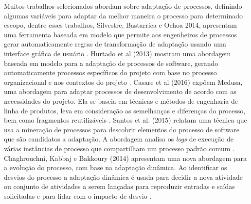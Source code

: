 Muitos trabalhos selecionados abordam sobre adaptação de processos, definindo algumas variáveis para adaptar da melhor maneira o processo para determinado escopo, dentre esses trabalhos, Silvestre, Bastarrica e Ochoa 2014, apresentam uma ferramenta baseada em modelo que permite aos engenheiros de processos gerar automaticamente regras de transformação de adaptação usando uma interface gráfica de usuário \cite{3silvestre:2014}. Hurtado et al (2013) mostram uma abordagem baseada em modelo para a adaptação de processos de software, gerando automaticamente processos específicos do projeto com base no processo organizacional e nos contextos do projeto \cite{11hurtado:2013}. Casare et al (2016) expõem Medusa, uma abordagem para adaptar processos de desenvolvimento de acordo com as necessidades do projeto. Ela se baseia em técnicas e métodos de engenharia de linha de produtos, leva em consideração as semelhanças e diferenças do processo, bem como fragmentos reutilizáveis \cite{16casare:2016}. Santos et al. (2015) relatam uma técnica que usa a mineração de processos para descobrir elementos do processo de software que são candidatos a adaptação. A abordagem analisa os \textit{logs} de execução de várias instâncias de processo que compartilham um processo padrão comum \cite{17santos:2015}. Chaghrouchni, Kabbaj e Bakkoury (2014) apresentam uma nova abordagem para a evolução do processo, com base na adaptação dinâmica. Ao identificar os desvios do processo a adaptação dinâmica é usada para decidir a nova atividade ou conjunto de atividades a serem lançadas para reproduzir entradas e saídas solicitadas e para lidar com o impacto de desvio \cite{18chaghrouchni:2014}.

